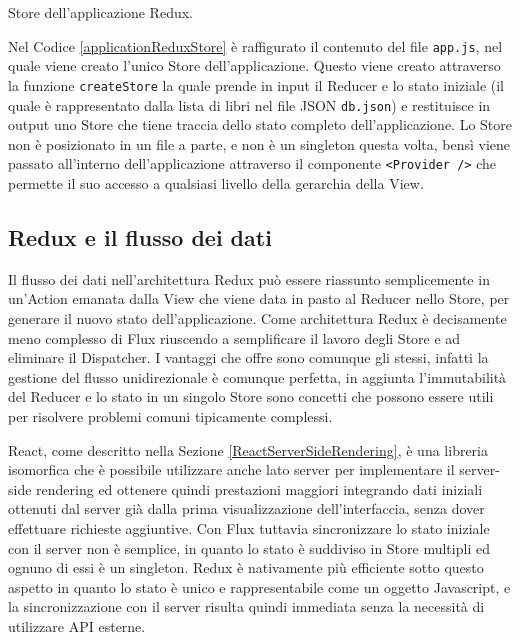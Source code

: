\begin{listing}[ht]
\inputminted{javascript}{sources/applicationReduxStore.js}
\caption{Store dell'applicazione Redux.} 
\label{applicationReduxStore} 
\end{listing}

Nel Codice \ref{applicationReduxStore} è raffigurato il contenuto del file \texttt{app.js}, nel quale viene creato l'unico Store dell'applicazione. Questo viene creato attraverso
la funzione \texttt{createStore} la quale prende in input il Reducer e lo stato iniziale (il quale è rappresentato dalla lista di libri nel file JSON \texttt{db.json}) e restituisce in output uno Store che tiene traccia dello stato completo dell'applicazione.
Lo Store non è posizionato in un file a parte, e non è un singleton questa volta, bensì viene passato all'interno dell'applicazione attraverso il componente \texttt{<Provider />} che permette il suo accesso a qualsiasi livello della gerarchia della View.

\subsection{Redux e il flusso dei dati}
Il flusso dei dati nell'architettura Redux può essere riassunto semplicemente in un'Action emanata dalla View che viene data in pasto al Reducer nello Store, per generare il nuovo stato dell'applicazione.
Come architettura Redux è decisamente meno complesso di Flux riuscendo a semplificare il lavoro degli Store e ad eliminare il Dispatcher. I vantaggi che offre sono comunque gli stessi, infatti la gestione del flusso unidirezionale è comunque perfetta, in aggiunta l'immutabilità del Reducer e lo stato in un singolo Store sono concetti che possono essere utili per risolvere problemi comuni tipicamente complessi.

React, come descritto nella Sezione \ref{ReactServerSideRendering}, è una libreria isomorfica che è possibile utilizzare anche lato server per implementare il server-side rendering ed ottenere quindi prestazioni maggiori integrando dati iniziali ottenuti dal server già dalla prima visualizzazione dell'interfaccia, senza dover effettuare richieste aggiuntive. Con Flux tuttavia sincronizzare lo stato iniziale con il server non è semplice, in quanto lo stato è suddiviso in Store multipli ed ognuno di essi è un singleton. Redux è nativamente più efficiente sotto questo aspetto in quanto lo stato è unico e rappresentabile come un oggetto Javascript, e la sincronizzazione con il server risulta quindi immediata senza la necessità di utilizzare API esterne.

